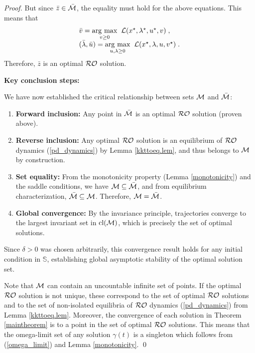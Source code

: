 \documentclass[journal,twoside,web]{ieeecolor}
\newcommand{\argmax}[1]{\underset{#1}{\operatorname{arg}\,\operatorname{max}}\;}
\begin{document}
\begin{proof}
But since $\bar{z}\in \bar {\cal M}$, the equality must hold for the above equations. This means that
\begin{align*}
\begin{array}{l}
\bar{v}=\argmax{v \geq 0}\; {\cal L}(x^\star,\lambda^\star,u^\star,v)\;,\\
(\bar{\lambda},\bar{u})=\argmax{u,\lambda \geq 0}\; {\cal L}(x^\star,\lambda,u,v^\star)\;.
\end{array}
\end{align*}
Therefore, ${\bar{z}}$ is an optimal ${\cal RO}$ solution. 

{\color{blue} \textbf{Key conclusion steps:}} {\color{blue} We have now established the critical relationship between sets ${\cal M}$ and $\bar{\cal M}$:
\begin{enumerate}
\item \textbf{Forward inclusion:} Any point in $\bar{\cal M}$ is an optimal ${\cal RO}$ solution (proven above).
\item \textbf{Reverse inclusion:} Any optimal ${\cal RO}$ solution is an equilibrium of ${\cal RO}$ dynamics (\ref{pd_dynamics}) by Lemma \ref{kkttoeq.lem}, and thus belongs to ${\cal M}$ by construction.
\item \textbf{Set equality:} From the monotonicity property (Lemma \ref{monotonicity}) and the saddle conditions, we have ${\cal M} \subseteq \bar{\cal M}$, and from equilibrium characterization, $\bar{\cal M} \subseteq {\cal M}$. Therefore, ${\cal M} = \bar{\cal M}$.
\item \textbf{Global convergence:} By the invariance principle, trajectories converge to the largest invariant set in $\text{cl}({\cal M})$, which is precisely the set of optimal solutions.
\end{enumerate}

Since $\delta > 0$ was chosen arbitrarily, this convergence result holds for any initial condition in $\mathbb S$, establishing global asymptotic stability of the optimal solution set.}

Note that ${\cal M}$ can contain an uncountable infinite set of points. If the optimal ${\cal RO}$ solution is not unique, these correspond to the set of optimal ${\cal RO}$ solutions and to the set of non-isolated equilibria of ${\cal RO}$ dynamics (\ref{pd_dynamics}) from Lemma \ref{kkttoeq.lem}. Moreover, the convergence of each solution in Theorem \ref{maintheorem} is to a point in the set of optimal ${\cal RO}$ solutions. This means that the omega-limit set of any solution $\gamma(t)$ is a singleton which follows from (\ref{omega_limit}) and Lemma \ref{monotonicity}.
\qed
\end{proof}
\end{document}
